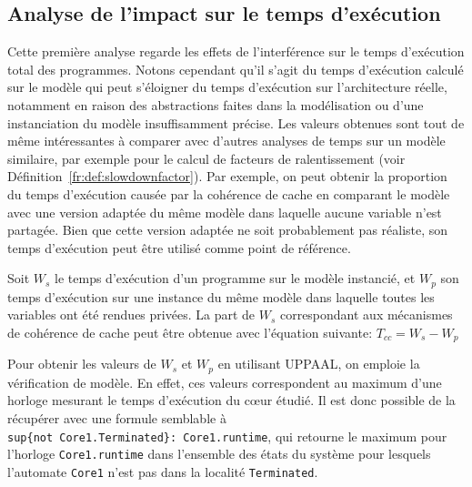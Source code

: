 \subsection{Analyse de l'impact sur le temps d'exécution}
\label{fr:sec:analysis:wcet}
Cette première analyse regarde les effets de l'interférence sur le temps
d'exécution total des programmes. Notons cependant qu'il s'agit du temps d'exécution calculé sur le modèle
qui peut s'éloigner du temps d'exécution sur l'architecture réelle, notamment en raison des abstractions faites dans la modélisation ou d'une instanciation du modèle insuffisamment précise. 
Les valeurs obtenues sont tout de même intéressantes à comparer avec
d'autres analyses de temps sur un modèle similaire, par exemple pour
le calcul de facteurs de ralentissement (voir
Définition~\ref{fr:def:slowdownfactor}). Par exemple, on peut obtenir
la proportion du temps d'exécution causée par la cohérence de cache en
comparant le modèle avec une version adaptée du même modèle dans laquelle
aucune variable n'est partagée. Bien que cette version adaptée ne soit
probablement pas réaliste, son temps d'exécution peut être utilisé
comme point de référence.

\begin{definition}
Soit $W_{s}$ le temps d'exécution d'un programme sur le modèle instancié, et
$W_{p}$ son temps d'exécution sur une instance du même modèle dans laquelle
toutes les variables ont été rendues privées. La part de $W_{s}$ correspondant
aux mécanismes de cohérence de cache peut être obtenue avec l'équation suivante:
$T_{cc} = W_{s} - W_{p}$
\end{definition}

Pour obtenir les valeurs de $W_{s}$ et $W_{p}$ en utilisant UPPAAL, on emploie
la vérification de modèle. En effet, ces valeurs correspondent au maximum d'une
horloge mesurant le temps d'exécution du cœur étudié. Il est donc possible de la
récupérer avec une formule semblable à\\
\lstinline!sup{not Core1.Terminated}: Core1.runtime!, qui retourne le maximum
pour l'horloge \lstinline!Core1.runtime! dans l'ensemble des états du système
pour lesquels l'automate \lstinline!Core1! n'est pas dans la localité
\lstinline!Terminated!.

